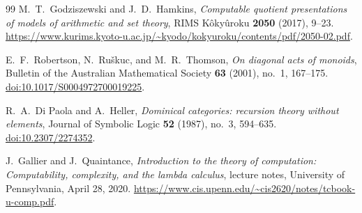 \documentclass[11pt]{article}
\begin{document}
\begin{thebibliography}{99}
M.~T.~Godziszewski and J.~D.~Hamkins,
\emph{Computable quotient presentations of models of arithmetic and set theory},
RIMS K\^oky\^uroku \textbf{2050} (2017), 9--23.
\url{https://www.kurims.kyoto-u.ac.jp/~kyodo/kokyuroku/contents/pdf/2050-02.pdf}.

E.~F.~Robertson, N.~Ru\v{s}kuc, and M.~R.~Thomson,
\emph{On diagonal acts of monoids},
Bulletin of the Australian Mathematical Society \textbf{63} (2001), no.~1,
167--175.
\href{https://doi.org/10.1017/S0004972700019225}{doi:10.1017/S0004972700019225}.

R.~A.~Di Paola and A.~Heller,
\emph{Dominical categories: recursion theory without elements},
Journal of Symbolic Logic \textbf{52} (1987), no.~3, 594--635.
\href{https://doi.org/10.2307/2274352}{doi:10.2307/2274352}.

J.~Gallier and J.~Quaintance,
\emph{Introduction to the theory of computation:
Computability, complexity, and the lambda calculus},
lecture notes, University of Pennsylvania, April 28, 2020.
\url{https://www.cis.upenn.edu/~cis2620/notes/tcbook-u-comp.pdf}.

\end{thebibliography}
\end{document}
